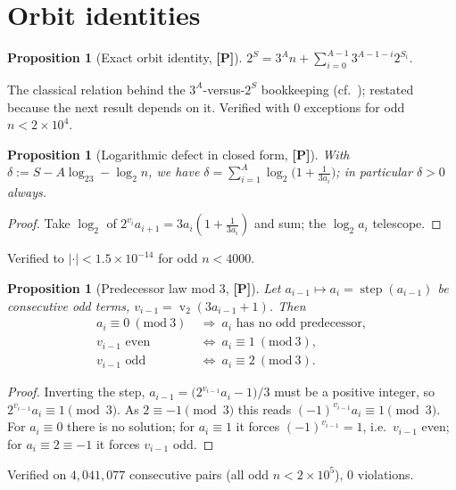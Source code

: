 \documentclass[11pt,a4paper]{article}
\theoremstyle{plain}
\newtheorem{proposition}[theorem]{Proposition}
\theoremstyle{definition}
\newcommand{\val}{\operatorname{v}_2}
\newcommand{\step}{\operatorname{step}}
\begin{document}
\section{Orbit identities}
\begin{proposition}[Exact orbit identity, {\bf[P]}]\label{prop:series}
$\displaystyle 2^{S}=3^{A}n+\sum_{i=0}^{A-1}3^{A-1-i}2^{S_i}$.
\end{proposition}
\noindent The classical relation behind the $3^A$-versus-$2^S$ bookkeeping
(cf.~\cite{lagarias}); restated because the next result depends on it. Verified with $0$
exceptions for odd $n<2\times10^4$.

\begin{proposition}[Logarithmic defect in closed form, {\bf[P]}]\label{prop:delta}
With $\delta:=S-A\log_23-\log_2n$, we have
$\delta=\sum_{i=1}^{A}\log_2\bigl(1+\tfrac1{3a_i}\bigr)$; in particular $\delta>0$ always.
\end{proposition}
\begin{proof}
Take $\log_2$ of $2^{v_i}a_{i+1}=3a_i(1+\tfrac1{3a_i})$ and sum; the $\log_2a_i$ telescope.
\end{proof}
\noindent Verified to $|\cdot|<1.5\times10^{-14}$ for odd $n<4000$.

\begin{proposition}[Predecessor law mod 3, {\bf[P]}]\label{prop:mod3}
Let $a_{i-1}\mapsto a_i=\step(a_{i-1})$ be consecutive odd terms, $v_{i-1}=\val(3a_{i-1}+1)$.
Then
\begin{align*}
  a_i\equiv0\ (\mathrm{mod}\ 3)\ &\Longrightarrow\ a_i\text{ has no odd predecessor},\\
  v_{i-1}\text{ even}\ &\Longleftrightarrow\ a_i\equiv1\ (\mathrm{mod}\ 3),\\
  v_{i-1}\text{ odd}\ &\Longleftrightarrow\ a_i\equiv2\ (\mathrm{mod}\ 3).
\end{align*}
\end{proposition}
\begin{proof}
Inverting the step, $a_{i-1}=\bigl(2^{v_{i-1}}a_i-1\bigr)/3$ must be a positive integer, so
$2^{v_{i-1}}a_i\equiv1\pmod3$. As $2\equiv-1\pmod3$ this reads
$(-1)^{v_{i-1}}a_i\equiv1\pmod3$. For $a_i\equiv0$ there is no solution; for $a_i\equiv1$ it
forces $(-1)^{v_{i-1}}=1$, i.e.\ $v_{i-1}$ even; for $a_i\equiv2\equiv-1$ it forces
$v_{i-1}$ odd.
\end{proof}
\noindent Verified on $4{,}041{,}077$ consecutive pairs (all odd $n<2\times10^5$), $0$
violations.
\end{document}
